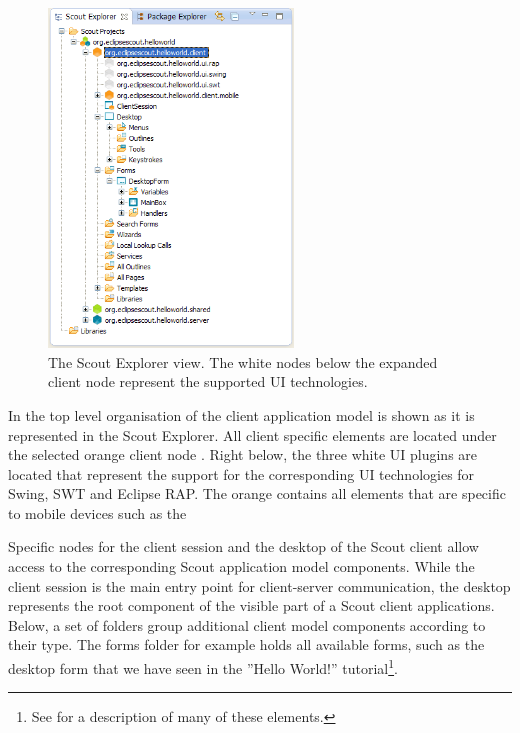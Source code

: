 \documentclass[a4paper,10pt,twoside]{book}
\begin{document}
\begin{figure}
\includegraphics[width=6.5cm]{explorer_client.png} 
\caption{The Scout Explorer view. The white nodes below the expanded client node represent the supported UI technologies.}
\end{figure}

In  the top level organisation of the client application model is shown as it is represented in the Scout Explorer.
All client specific elements are located under the selected orange client node . 
Right below, the three white UI plugins are located that represent the support for the corresponding UI technologies for Swing, SWT and Eclipse RAP. 
The orange  contains all elements that are specific to mobile devices such as the 

Specific nodes for the client session and the desktop of the Scout client allow access to the corresponding Scout application model components. 
While the client session is the main entry point for client-server communication, the desktop represents the root component of the visible part of a Scout client applications. 
Below, a set of folders group additional client model components according to their type. 
The forms folder for example holds all available forms, such as the desktop form that we have seen in the ''Hello World!'' tutorial\footnote{
See  for a description of many of these elements.
}. 
\end{document}
